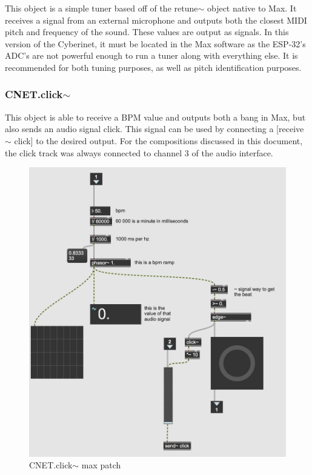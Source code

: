This object is a simple tuner based off of the retune$\sim$ object native to Max. It receives a signal from an external microphone and outputs both the closest MIDI pitch and frequency of the sound. These values are output as signals. In this version of the Cyberinet, it must be located in the Max software as the ESP-32's ADC's are not powerful enough to run a tuner along with everything else. It is recommended for both tuning purposes, as well as pitch identification purposes. 
 

\subsubsection{CNET.click$\sim$}
This object is able to receive a BPM value and outputs both a bang in Max, but also sends an audio signal click. This signal can be used by connecting a [receive$\sim$ click] to the desired output. For the compositions discussed in this document, the click track was always connected to channel 3 of the audio interface.

\begin{figure}
    \centering
    \includegraphics[scale=0.2]{diagrams/maxPatches/CNET.click~.jpg}
    \caption{CNET.click$\sim$ max patch}
    \label{fig:CNET.clickPAtch}
\end{figure}

